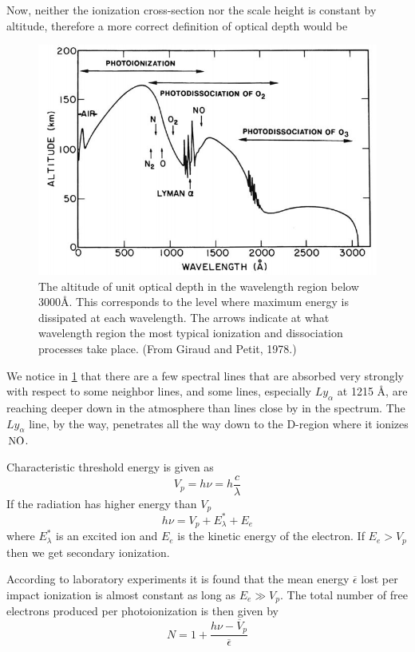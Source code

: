 Now, neither the ionization cross-section nor the scale height is constant by altitude, therefore a more correct definition of optical depth would be
\begin{figure}[t]
    \centering
    \includegraphics[width=.6\linewidth]{bilder/L10_optical_depth_wavelength.jpg}
    \caption{The altitude of unit optical depth in the wavelength region below \(\num{3000}\si{\angstrom}\). This corresponds to the level where maximum energy is dissipated at each wavelength. The arrows indicate at what wavelength region the most typical ionization and dissociation processes take place. (From Giraud and Petit, 1978.)}\label{fig:L10_optical_depth_wavelength}
\end{figure}

We notice in \cref{fig:L10_optical_depth_wavelength} that there are a few spectral lines that are absorbed very strongly with respect to some neighbor lines, and some lines, especially \(Ly_\alpha \) at 1215 Å, are reaching deeper down in the atmosphere than lines close by in the spectrum. The \(Ly_\alpha \) line, by the way, penetrates all the way down to the D-region where it ionizes \(\prescript{}{}{\textnormal{NO}}\).

Characteristic threshold energy is given as
\begin{equation*}
    V_p=h\nu=h\frac{c}{\lambda}
\end{equation*}
If the radiation has higher energy than \(V_p\)
\begin{equation*}
    h\nu=V_p+E_\lambda^*+E_e
\end{equation*}
where \(E_\lambda^*\) is an excited ion and \(E_e\) is the kinetic energy of the electron. If \(E_e>V_p\) then we get secondary ionization.

According to laboratory experiments it is found that the mean energy \(\overline{\epsilon}\) lost per impact ionization is almost constant as long as \(E_e\gg V_p\). The total number of free electrons produced per photoionization is then given by
\begin{equation*}
    N=1+\frac{h\nu-\overline{V}_p}{\overline{\epsilon}}
\end{equation*}

